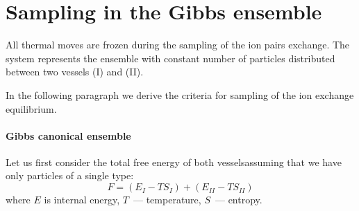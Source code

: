 \documentclass{elsarticle}
\begin{document}





\section{Sampling in the Gibbs ensemble\label{sec: sampling the gibbs ensemble}}
All thermal moves are frozen during the sampling of the ion pairs exchange.
The system represents the ensemble with constant number of particles distributed between two vessels (I) and (II).

In the following paragraph we derive the criteria for sampling of the ion exchange equilibrium.
\paragraph{Gibbs canonical ensemble}
Let us first consider the total free energy of both vesselsassuming that we have only particles of a single type:
\begin{equation}
    F=\left(E_{I}-TS_{I}\right) + \left(E_{II}-TS_{II}\right) \label{eq:F-gibbs}
\end{equation}
where $E$ is internal energy, $T$~--- temperature, $S$~--- entropy.
\end{document}
